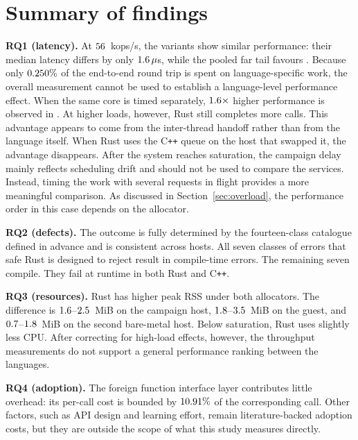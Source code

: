 \documentclass[english,oneside,a4paper,censored,csm,software-track-2020]{HYthesisML}
\begin{document}
\section{Summary of findings}
\begin{compactitem}
\item \textbf{RQ1 (latency).} At $56$~kops/s, the variants show similar
performance: their median latency differs by only $1.6\,\mu$s, while the pooled far
tail favours \FarTailLower{}. Because only $0.250\%$ of the end-to-end round trip
is spent on language-specific work, the overall measurement cannot be used to establish a
language-level performance effect. When the same core is timed separately, $1.6\times$
higher performance is observed in \BudgetCoreFaster{}. At higher loads, however, Rust still
completes more calls. This advantage appears to come from the inter-thread handoff rather than
from the language itself. When Rust uses the C\texttt{++} queue on the host that swapped it, the
advantage disappears. After the system reaches saturation, the campaign delay mainly reflects
scheduling drift and should not be used to compare the services. Instead, timing the work with
several requests in flight provides a more meaningful comparison. As discussed in
Section~\ref{sec:overload}, the performance order in this case depends on the allocator.

\item \textbf{RQ2 (defects).} The outcome is fully determined by the fourteen-class catalogue
defined in advance and is consistent across hosts. All seven classes of errors that safe Rust is
designed to reject result in compile-time errors. The remaining seven compile. They fail at
runtime in both Rust and C\texttt{++}.

\item \textbf{RQ3 (resources).} Rust has higher peak RSS under both allocators. The difference is
$1.6$--$2.5$~MiB on the campaign host, $1.8$--$3.5$~MiB
on the guest, and $0.7$--$1.8$~MiB on the second bare-metal host. Below
saturation, Rust uses slightly less CPU. After correcting for high-load effects, however, the
throughput measurements do not support a general performance ranking between the languages.

\item \textbf{RQ4 (adoption).} The foreign function interface layer contributes little overhead:
its per-call cost is bounded by $10.91\%$ of the corresponding call. Other factors, such
as API design and learning effort, remain literature-backed adoption costs, but they are outside
the scope of what this study measures directly.
\end{compactitem}
\end{document}
